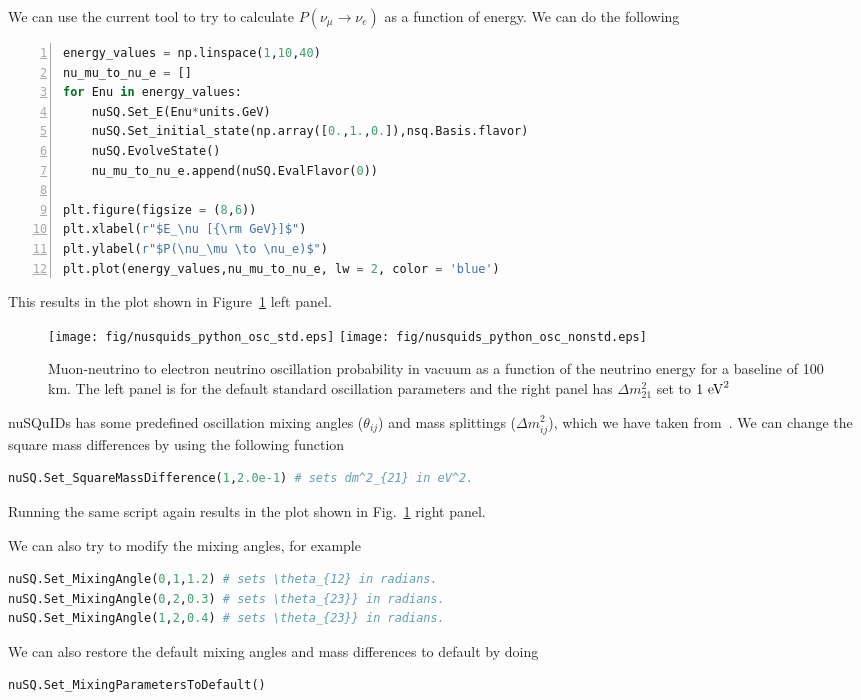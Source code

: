 \documentclass[3p,12pt]{elsarticle}
\begin{document}
We can use the current tool to try to calculate $P(\nu_\mu \to \nu_e)$ as a function of energy. We can do the following
\begin{lstlisting}[language=Python, frame=leftline, numbers=left, breaklines=true]
energy_values = np.linspace(1,10,40)
nu_mu_to_nu_e = []
for Enu in energy_values:
    nuSQ.Set_E(Enu*units.GeV)
    nuSQ.Set_initial_state(np.array([0.,1.,0.]),nsq.Basis.flavor)
    nuSQ.EvolveState()
    nu_mu_to_nu_e.append(nuSQ.EvalFlavor(0))

plt.figure(figsize = (8,6))
plt.xlabel(r"$E_\nu [{\rm GeV}]$")
plt.ylabel(r"$P(\nu_\mu \to \nu_e)$")
plt.plot(energy_values,nu_mu_to_nu_e, lw = 2, color = 'blue')
\end{lstlisting}
This results in the plot shown in Figure~\ref{fig:nusquids_python_osc} left panel.
\begin{figure}[h!]
  \label{fig:nusquids_python_osc}
  \centering
  \texttt{[image: fig/nusquids\_python\_osc\_std.eps]}
  \texttt{[image: fig/nusquids\_python\_osc\_nonstd.eps]}
  \caption{Muon-neutrino to electron neutrino oscillation probability in vacuum as a function of the neutrino energy for a baseline of 100 km. 
  The left panel is for the default standard oscillation parameters and the right panel has $\Delta m^2_{21}$ set to $1~{\rm eV}^2$}
\end{figure}

nuSQuIDs has some predefined oscillation mixing angles ($\theta_{ij}$) and mass splittings ($\Delta m^2_{ij}$),
which we have taken from~\cite{Esteban:2020cvm}.
We can change the square mass differences by using the following function
\begin{lstlisting}[language=Python, breaklines=true]
nuSQ.Set_SquareMassDifference(1,2.0e-1) # sets dm^2_{21} in eV^2.
\end{lstlisting}

Running the same script again results in the plot shown in Fig.~\ref{fig:nusquids_python_osc} right panel.

We can also try to modify the mixing angles, for example
\begin{lstlisting}[language=Python, breaklines=true]
nuSQ.Set_MixingAngle(0,1,1.2) # sets \theta_{12} in radians.
nuSQ.Set_MixingAngle(0,2,0.3) # sets \theta_{23}} in radians.
nuSQ.Set_MixingAngle(1,2,0.4) # sets \theta_{23}} in radians.
\end{lstlisting}
We can also restore the default mixing angles and mass differences to default by doing
\begin{lstlisting}[language=Python, breaklines=true]
nuSQ.Set_MixingParametersToDefault()
\end{lstlisting}
\end{document}

